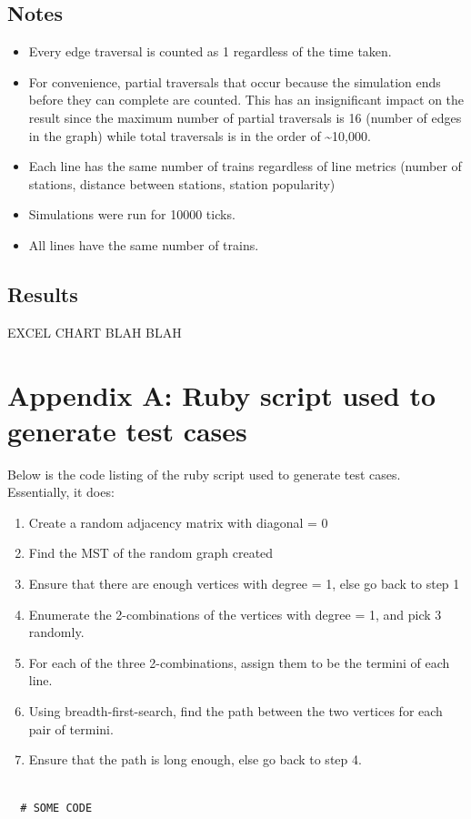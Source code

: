 \documentclass[a4paper,12pt]{article}
\begin{document}
\subsection{Notes}
\begin{itemize}
	\item Every edge traversal is counted as 1 regardless of the time taken.
	\item For convenience, partial traversals that occur because the simulation ends before they can complete are counted. This has an insignificant impact on the result since the maximum number of partial traversals is 16 (number of edges in the graph) while total traversals is in the order of \textasciitilde10,000.
	\item Each line has the same number of trains regardless of line metrics (number of stations, distance between stations, station popularity)
	\item Simulations were run for 10000 ticks.
	\item All lines have the same number of trains.
\end{itemize}

\subsection{Results}
EXCEL CHART BLAH BLAH


\newpage
\section{Appendix A: Ruby script used to generate test cases}
Below is the code listing of the ruby script used to generate test cases. Essentially, it does:
\begin{enumerate}
	\item Create a random adjacency matrix with diagonal = 0
	\item Find the MST of the random graph created
	\item Ensure that there are enough vertices with degree = 1, else go back to step 1
	\item Enumerate the 2-combinations of the vertices with degree = 1, and pick 3 randomly.
	\item For each of the three 2-combinations, assign them to be the termini of each line.
	\item Using breadth-first-search, find the path between the two vertices for each pair of termini.
	\item Ensure that the path is long enough, else go back to step 4.
\end{enumerate}
\begin{verbatim}

  # SOME CODE

	\end{verbatim}
\end{document}
